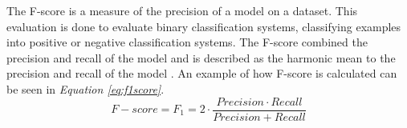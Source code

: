 The F-score is a measure of the precision of a model on a dataset. This evaluation is done to evaluate binary classification systems, classifying examples into positive or negative classification systems. 
The F-score combined the precision and recall of the model and is described as the harmonic mean to the precision and recall of the model \cite{wood_f-score_2019}.
An example of how F-score is calculated can be seen in \textit{Equation \ref{eq:f1score}}.
\begin{equation}
  F- score = F_1 = 2 \cdot \frac{Precision \cdot Recall}{Precision + Recall}
  \label{eq:f1score}
\end{equation}


